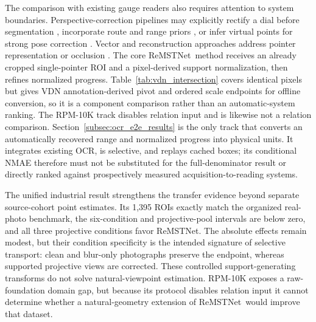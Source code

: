 \documentclass[electronics,article,submit,oneauthor]{Definitions/mdpi}
\newcommand{\modelname}{ReMSTNet}
\begin{document}
The comparison with existing gauge readers also requires attention to system boundaries. Perspective-correction pipelines may explicitly rectify a dial before segmentation \cite{tan2024transunet}, incorporate route and range priors \cite{chu2025prikmet}, or infer virtual points for strong pose correction \cite{lee2026p2yolo}. Vector and reconstruction approaches address pointer representation or occlusion \cite{dong2021vdn,ninama2026grnet}. The core \modelname\ method receives an already cropped single-pointer ROI and a pixel-derived support normalization, then refines normalized progress. Table~\ref{tab:vdn_intersection} covers identical pixels but gives VDN annotation-derived pivot and ordered scale endpoints for offline conversion, so it is a component comparison rather than an automatic-system ranking. The RPM-10K track disables relation input and is likewise not a relation comparison. Section~\ref{subsec:ocr_e2e_results} is the only track that converts an automatically recovered range and normalized progress into physical units. It integrates existing OCR, is selective, and replays cached boxes; its conditional NMAE therefore must not be substituted for the full-denominator result or directly ranked against prospectively measured acquisition-to-reading systems.

The unified industrial result strengthens the transfer evidence beyond separate source-cohort point estimates. Its 1,395 ROIs exactly match the organized real-photo benchmark, the six-condition and projective-pool intervals are below zero, and all three projective conditions favor \modelname. The absolute effects remain modest, but their condition specificity is the intended signature of selective transport: clean and blur-only photographs preserve the endpoint, whereas supported projective views are corrected. These controlled support-generating transforms do not solve natural-viewpoint estimation. RPM-10K exposes a raw-foundation domain gap, but because its protocol disables relation input it cannot determine whether a natural-geometry extension of \modelname\ would improve that dataset.
\end{document}
